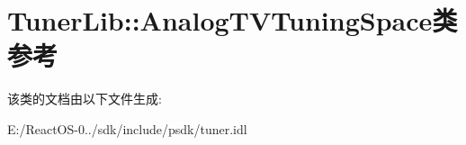 \hypertarget{class_tuner_lib_1_1_analog_t_v_tuning_space}{}\section{Tuner\+Lib\+:\+:Analog\+T\+V\+Tuning\+Space类 参考}
\label{class_tuner_lib_1_1_analog_t_v_tuning_space}


该类的文档由以下文件生成\+:\begin{DoxyCompactItemize}
\item 
E\+:/\+React\+O\+S-\/0../sdk/include/psdk/tuner.\+idl\end{DoxyCompactItemize}
